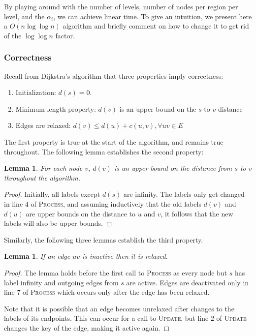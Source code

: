 \documentclass[12pt]{article}
\newtheorem{lemma}[theorem]{Lemma}
\begin{document}
By playing around with the number of levels, number of nodes per region per level, and the $\alpha_i$, we can achieve linear time. To give an intuition, we present here a $O(n \log \log n)$ algorithm and briefly comment on how to change it to get rid of the $\log \log n$ factor.

\subsubsection{Correctness}
\label{sec:correctness}

Recall from Dijkstra's algorithm that three properties imply correctness:
\begin{enumerate}
\item Initialization: $d(s) = 0$.
\item Minimum length property: $d(v)$ is an upper bound on the $s$ to $v$ distance
\item Edges are relaxed: $d(v) \leq d(u) + c(u,v), \forall uv \in E$
\end{enumerate}

The first property is true at the start of the algorithm, and remains true throughout. The following lemma establishes the second property:\\

\begin{lemma}
  For each node $v$, $d(v)$ is an upper bound on the distance from $s$ to $v$ throughout the algorithm.
\end{lemma}

\begin{proof}
  Initially, all labels except $d(s)$ are infinity. The labels only get changed in line $4$ of \textsc{Process}, and assuming inductively that the old labels $d(v)$ and $d(u)$ are upper bounds on the distance to $u$ and $v$, it follows that the new labels will also be upper bounds.
\end{proof}

Similarly, the following three lemmas establish the third property.\\

\begin{lemma}
  If an edge $uv$ is inactive then it is relaxed.
\end{lemma}

\begin{proof}
  The lemma holds before the first call to \textsc{Process} as every node but $s$ has label infinity and outgoing edges from $s$ are active. Edges are deactivated only in line $7$ of \textsc{Process} which occurs only after the edge has been relaxed.

  Note that it is possible that an edge becomes unrelaxed after changes to the labels of its endpoints. This can occur for a call to \textsc{Update}, but line $2$ of \textsc{Update} changes the key of the edge, making it active again.
\end{proof}
\end{document}
